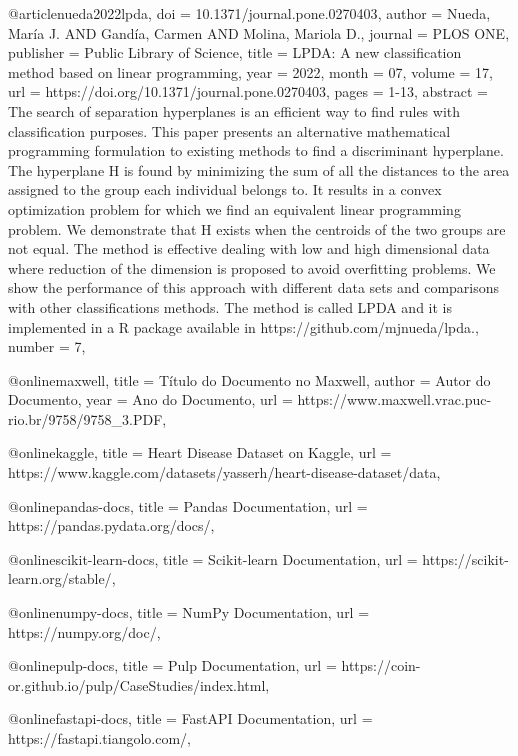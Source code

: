 
@article{nueda2022lpda,
  doi       = {10.1371/journal.pone.0270403},
  author    = {Nueda, María J. AND Gandía, Carmen AND Molina, Mariola D.},
  journal   = {PLOS ONE},
  publisher = {Public Library of Science},
  title     = {LPDA: A new classification method based on linear programming},
  year      = {2022},
  month     = {07},
  volume    = {17},
  url       = {https://doi.org/10.1371/journal.pone.0270403},
  pages     = {1-13},
  abstract  = {The search of separation hyperplanes is an efficient way to find rules with classification purposes. This paper presents an alternative mathematical programming formulation to existing methods to find a discriminant hyperplane. The hyperplane H is found by minimizing the sum of all the distances to the area assigned to the group each individual belongs to. It results in a convex optimization problem for which we find an equivalent linear programming problem. We demonstrate that H exists when the centroids of the two groups are not equal. The method is effective dealing with low and high dimensional data where reduction of the dimension is proposed to avoid overfitting problems. We show the performance of this approach with different data sets and comparisons with other classifications methods. The method is called LPDA and it is implemented in a R package available in https://github.com/mjnueda/lpda.},
  number    = {7},
}

@online{maxwell,
  title   = {Título do Documento no Maxwell},
  author  = {Autor do Documento},
  year    = {Ano do Documento},
  url     = {https://www.maxwell.vrac.puc-rio.br/9758/9758_3.PDF},
}

@online{kaggle,
  title   = {Heart Disease Dataset on Kaggle},
  url     = {https://www.kaggle.com/datasets/yasserh/heart-disease-dataset/data},
}

@online{pandas-docs,
  title   = {Pandas Documentation},
  url     = {https://pandas.pydata.org/docs/},
}

@online{scikit-learn-docs,
  title   = {Scikit-learn Documentation},
  url     = {https://scikit-learn.org/stable/},
}

@online{numpy-docs,
  title   = {NumPy Documentation},
  url     = {https://numpy.org/doc/},
}

@online{pulp-docs,
  title   = {Pulp Documentation},
  url     = {https://coin-or.github.io/pulp/CaseStudies/index.html},
}

@online{fastapi-docs,
  title   = {FastAPI Documentation},
  url     = {https://fastapi.tiangolo.com/},
}
